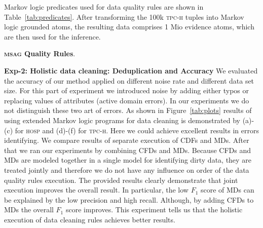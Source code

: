 
Markov logic predicates used for data quality rules are shown in Table~\ref{tab:predicates}. After transforming the 100k \textsc{tpc-h} tuples into Markov logic grounded atoms, the resulting data comprises 1 Mio evidence atoms, which are then used for the inference.

\textbf{\textsc{msag} Quality Rules}. 

\textbf{Exp-2: Holistic data cleaning: Deduplication and Accuracy} We evaluated the accuracy of our method applied on different noise rate and different data set size. For this part of experiment we introduced noise by adding either typos or replacing values of attributes (active domain errors). In our experiments we do not distinguish these two art of errors. As shown in Figure~\ref{tab:plots} results of using extended Markov logic programs for data cleaning is demonstrated by (a)-(c) for \textsc{hosp} and (d)-(f) for \textsc{tpc-h}. Here we could achieve excellent results in errors identifying. We compare results of separate execution of CDFs and MDs. After that we ran our experiments by combining CFDs and MDs. Because CFDs and MDs are modeled together in a single model for identifying dirty data, they are treated jointly and therefore we do not have any influence on order of the data quality rules execution. The provided results clearly demonstrate that joint execution improves the overall result. In particular, the low $F_1$ score of MDs can be explained by the low precision and high recall. Although, by adding CFDs to MDs the overall $F_1$ score improves. This experiment tells us that the holistic execution of data cleaning rules achieves better results. 


